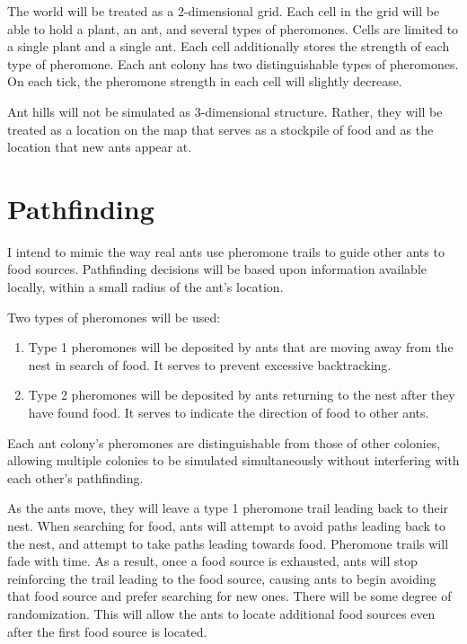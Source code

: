\documentclass[journal]{IEEEtran}
\begin{document}
The world will be treated as a 2-dimensional grid.  Each cell in the grid will be able to hold a plant, an ant, and several types of pheromones.  Cells are limited to a single plant and a single ant.  Each cell additionally stores the strength of each type of pheromone.  Each ant colony has two distinguishable types of pheromones.  On each tick, the pheromone strength in each cell will slightly decrease.

Ant hills will not be simulated as 3-dimensional structure.  Rather, they will be treated as a location on the map that serves as a stockpile of food and as the location that new ants appear at.

\section{Pathfinding}

I intend to mimic the way real ants use pheromone trails to guide other ants to food sources.  Pathfinding decisions will be based upon information available locally, within a small radius of the ant's location.


Two types of pheromones will be used:

\begin{enumerate}
\item Type 1 pheromones will be deposited by ants that are moving away from the nest in search of food.  It serves to prevent excessive backtracking.
\item Type 2 pheromones will be deposited by ants returning to the nest after they have found food.  It serves to indicate the direction of food to other ants.
\end{enumerate}

Each ant colony's pheromones are distinguishable from those of other colonies, allowing multiple colonies to be simulated simultaneously without interfering with each other's pathfinding.

As the ants move, they will leave a type 1 pheromone trail leading back to their nest.  When searching for food, ants will attempt to avoid paths leading back to the nest, and attempt to take paths leading towards food.
Pheromone trails will fade with time.  As a result, once a food source is exhausted, ants will stop reinforcing the trail leading to the food source, causing ants to begin avoiding that food source and prefer searching for new ones. 
There will be some degree of randomization.  This will allow the ants to locate additional food sources even after the first food source is located.
\end{document}

